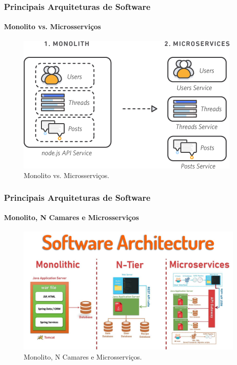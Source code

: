 \documentclass[
	10pt, %
	t, %
]{beamer}
\begin{document}
\begin{frame}
	\frametitle{Principais Arquiteturas de Software}
	\framesubtitle{Monolito vs. Microsserviços}

	\begin{figure}
		\centering
		\includegraphics[width=0.9\linewidth]{Images/mono_x_micro.png}
		\caption{Monolito vs. Microsserviços.}\label{fig:monolito-vs-microservicos}
	\end{figure}

\end{frame}

\begin{frame}
	\frametitle{Principais Arquiteturas de Software}
	\framesubtitle{Monolito, N Camares e Microsserviços}

	\begin{figure}
		\centering
		\includegraphics[width=0.9\linewidth]{Images/arquit-comparativo.jpg}
		\caption{Monolito, N Camares e Microsserviços.}\label{fig:comparativo}
	\end{figure}

\end{frame}
\end{document}
